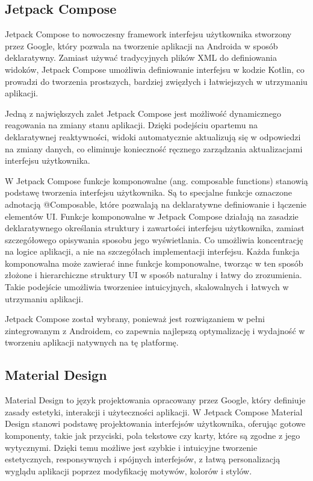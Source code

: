\documentclass[12pt,twoside]{article}
\begin{document}
\subsection{Jetpack Compose}

Jetpack Compose to nowoczesny framework interfejsu użytkownika stworzony przez Google, który pozwala 
na tworzenie aplikacji na Androida w sposób deklaratywny. Zamiast używać tradycyjnych plików XML do 
definiowania widoków, Jetpack Compose umożliwia definiowanie interfejsu w kodzie Kotlin, co prowadzi 
do tworzenia prostszych, bardziej zwięzłych i łatwiejszych w utrzymaniu aplikacji.

Jedną z największych zalet Jetpack Compose jest możliwość dynamicznego reagowania na zmiany stanu aplikacji. 
Dzięki podejściu opartemu na deklaratywnej reaktywności, widoki automatycznie aktualizują się w odpowiedzi na 
zmiany danych, co eliminuje konieczność ręcznego zarządzania aktualizacjami interfejsu użytkownika.

W Jetpack Compose funkcje komponowalne (ang. composable functions) stanowią podstawę tworzenia interfejsu 
użytkownika. Są to specjalne funkcje oznaczone adnotacją @Composable, które pozwalają na deklaratywne definiowanie 
i łączenie elementów UI. Funkcje komponowalne w Jetpack Compose działają na zasadzie deklaratywnego określania 
struktury i zawartości interfejsu użytkownika, zamiast szczegółowego opisywania sposobu jego wyświetlania. Co 
umożliwia koncentrację na logice aplikacji, a nie na szczegółach implementacji interfejsu. Każda funkcja 
komponowalna może zawierać inne funkcje komponowalne, tworząc w ten sposób złożone i hierarchiczne struktury UI 
w sposób naturalny i łatwy do zrozumienia. Takie podejście umożliwia tworzeniee intuicyjnych, skalowalnych i łatwych 
w utrzymaniu aplikacji.

Jetpack Compose został wybrany, ponieważ jest rozwiązaniem w pełni zintegrowanym z Androidem, 
co zapewnia najlepszą optymalizację i wydajność w tworzeniu aplikacji natywnych na tę platformę.

\subsection{Material Design}

Material Design to język projektowania opracowany przez Google, który definiuje zasady estetyki, interakcji i 
użyteczności aplikacji. W Jetpack Compose Material Design stanowi podstawę projektowania interfejsów użytkownika, 
oferując gotowe komponenty, takie jak przyciski, pola tekstowe czy karty, które są zgodne z jego wytycznymi. 
Dzięki temu możliwe jest szybkie i intuicyjne tworzenie estetycznych, responsywnych i spójnych interfejsów, z 
łatwą personalizacją wyglądu aplikacji poprzez modyfikację motywów, kolorów i stylów.
\end{document}
